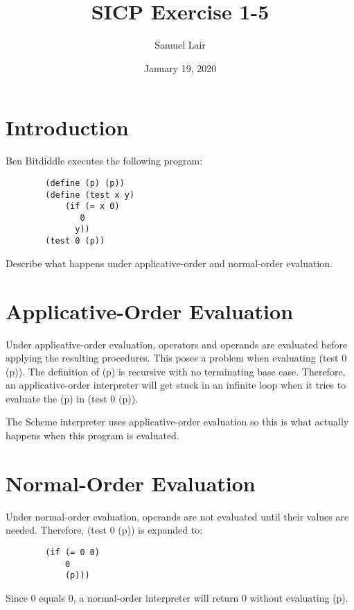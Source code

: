 \documentclass{article}
\title{SICP Exercise 1-5}
\author{Samuel Lair}
\date{January 19, 2020}
\begin{document}
\maketitle

\section{Introduction}

Ben Bitdiddle executes the following program:

\begin{verbatim}
        (define (p) (p))
        (define (test x y)
            (if (= x 0)
               0
              y))
        (test 0 (p))
\end{verbatim}

Describe what happens under applicative-order and normal-order evaluation.



\section{Applicative-Order Evaluation}

Under applicative-order evaluation, operators and operands are evaluated before applying the resulting procedures.  This poses a problem when evaluating (test 0 (p)).  The definition of (p) is recursive with no terminating base case.  Therefore, an applicative-order interpreter will get stuck in an infinite loop when it tries to evaluate the (p) in (test 0 (p)).

The Scheme interpreter uses applicative-order evaluation so this is what actually happens when this program is evaluated.

\section{Normal-Order Evaluation}
Under normal-order evaluation, operands are not evaluated until their values are needed.  Therefore, (test 0 (p)) is expanded to:

\begin{verbatim}
        (if (= 0 0)
            0
            (p)))
\end{verbatim}

Since 0 equals 0, a normal-order interpreter will return 0 without evaluating (p).
\end{document}
